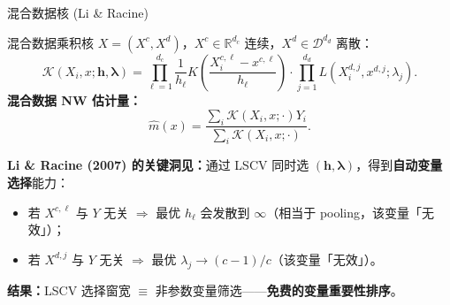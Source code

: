 \documentclass[aspectratio=169, 10pt]{beamer}
\begin{document}
\begin{frame}{混合数据核 (Li \& Racine)}

  \begin{definitionbox}{混合数据乘积核}
    $X = (X^c, X^d)$，$X^c\in\mathbb{R}^{d_c}$ 连续，$X^d\in\mathcal{D}^{d_d}$ 离散：
    \[
      \mathcal{K}(X_i, x;\mathbf{h}, \boldsymbol{\lambda})
      = \prod_{\ell=1}^{d_c} \frac{1}{h_\ell}K\!\left(\frac{X_i^{c,\ell} - x^{c,\ell}}{h_\ell}\right)
        \cdot \prod_{j=1}^{d_d} L(X_i^{d,j}, x^{d,j}; \lambda_j).
    \]
    \textbf{混合数据 NW 估计量：}
    \[
      \hat m(x) = \frac{\sum_i \mathcal{K}(X_i, x;\cdot) Y_i}{\sum_i \mathcal{K}(X_i, x;\cdot)}.
    \]
  \end{definitionbox}


  \begin{keybox}
    \textbf{Li \& Racine (2007) 的关键洞见：}通过 LSCV 同时选 $(\mathbf{h}, \boldsymbol{\lambda})$，得到\textbf{自动变量选择}能力：
    \begin{itemize}
      \item 若 $X^{c,\ell}$ 与 $Y$ 无关 $\Rightarrow$ 最优 $h_\ell$ 会发散到 $\infty$（相当于 pooling，该变量「无效」）；
      \item 若 $X^{d,j}$ 与 $Y$ 无关 $\Rightarrow$ 最优 $\lambda_j \to (c-1)/c$（该变量「无效」）。
    \end{itemize}
    \textbf{结果：}LSCV 选择窗宽 $\equiv$ 非参数变量筛选——\textbf{免费的变量重要性排序}。
  \end{keybox}

\end{frame}
\end{document}
